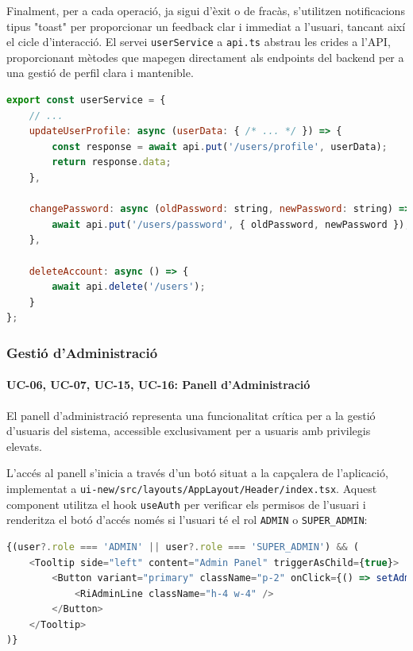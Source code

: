 Finalment, per a cada operació, ja sigui d'èxit o de fracàs, s'utilitzen notificacions tipus "toast" per proporcionar un feedback clar i immediat a l'usuari, tancant així el cicle d'interacció. El servei \texttt{userService} a \texttt{api.ts} abstrau les crides a l'API, proporcionant mètodes que mapegen directament als endpoints del backend per a una gestió de perfil clara i mantenible.

\begin{lstlisting}[language=javascript, caption={Mètodes del `userService` a `lib/api.ts`}]
export const userService = {
    // ...
    updateUserProfile: async (userData: { /* ... */ }) => {
        const response = await api.put('/users/profile', userData);
        return response.data;
    },

    changePassword: async (oldPassword: string, newPassword: string) => {
        await api.put('/users/password', { oldPassword, newPassword });
    },

    deleteAccount: async () => {
        await api.delete('/users');
    }
};
\end{lstlisting}

\subsubsection{Gestió d'Administració}
\paragraph{UC-06, UC-07, UC-15, UC-16: Panell d'Administració}
El panell d'administració representa una funcionalitat crítica per a la gestió d'usuaris del sistema, accessible exclusivament per a usuaris amb privilegis elevats.

L'accés al panell s'inicia a través d'un botó situat a la capçalera de l'aplicació, implementat a \texttt{ui-new/src/layouts/AppLayout/Header/index.tsx}. Aquest component utilitza el hook \texttt{useAuth} per verificar els permisos de l'usuari i renderitza el botó d'accés només si l'usuari té el rol \texttt{ADMIN} o \texttt{SUPER\_ADMIN}:

\begin{lstlisting}[language=javascript, caption={Renderitzat condicional del botó d'administració}]
{(user?.role === 'ADMIN' || user?.role === 'SUPER_ADMIN') && (
    <Tooltip side="left" content="Admin Panel" triggerAsChild={true}>
        <Button variant="primary" className="p-2" onClick={() => setAdminOpen(true)}> 
            <RiAdminLine className="h-4 w-4" />
        </Button>
    </Tooltip>
)}
\end{lstlisting}

